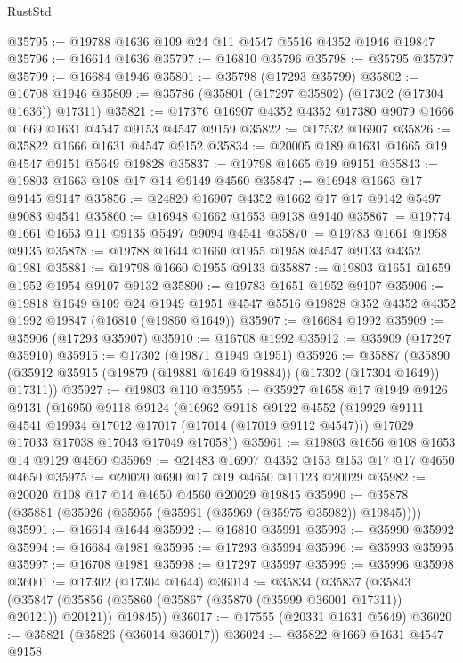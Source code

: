 \begin{lexlean}{RustStd}
\begin{coremodule}
@35795 := @19788 @1636 @109 @24 @11 @4547 @5516 @4352 @1946 @19847
@35796 := @16614 @1636
@35797 := @16810 @35796
@35798 := @35795 @35797
@35799 := @16684 @1946
@35801 := @35798 (@17293 @35799)
@35802 := @16708 @1946
@35809 := @35786 (@35801 (@17297 @35802) (@17302 (@17304 @1636)) @17311)
@35821 := @17376 @16907 @4352 @4352 @17380 @9079 @1666 @1669 @1631 @4547 @9153 @4547 @9159
@35822 := @17532 @16907
@35826 := @35822 @1666 @1631 @4547 @9152
@35834 := @20005 @189 @1631 @1665 @19 @4547 @9151 @5649 @19828
@35837 := @19798 @1665 @19 @9151
@35843 := @19803 @1663 @108 @17 @14 @9149 @4560
@35847 := @16948 @1663 @17 @9145 @9147
@35856 := @24820 @16907 @4352 @1662 @17 @17 @9142 @5497 @9083 @4541
@35860 := @16948 @1662 @1653 @9138 @9140
@35867 := @19774 @1661 @1653 @11 @9135 @5497 @9094 @4541
@35870 := @19783 @1661 @1958 @9135
@35878 := @19788 @1644 @1660 @1955 @1958 @4547 @9133 @4352 @1981
@35881 := @19798 @1660 @1955 @9133
@35887 := @19803 @1651 @1659 @1952 @1954 @9107 @9132
@35890 := @19783 @1651 @1952 @9107
@35906 := @19818
    @1649
    @109
    @24
    @1949
    @1951
    @4547
    @5516
    @19828
    @352
    @4352
    @4352
    @1992
    @19847
    (@16810 (@19860 @1649))
@35907 := @16684 @1992
@35909 := @35906 (@17293 @35907)
@35910 := @16708 @1992
@35912 := @35909 (@17297 @35910)
@35915 := @17302 (@19871 @1949 @1951)
@35926 := @35887
    (@35890 (@35912 @35915 (@19879 (@19881 @1649 @19884)) (@17302 (@17304 @1649)) @17311))
@35927 := @19803 @110
@35955 := @35927
    @1658
    @17
    @1949
    @9126
    @9131
    (@16950
      @9118
      @9124
      (@16962
        @9118
        @9122
        @4552
        (@19929 @9111 @4541 @19934 @17012 @17017 (@17014 (@17019 @9112 @4547)))
        @17029
        @17033
        @17038
        @17043
        @17049
        @17058))
@35961 := @19803 @1656 @108 @1653 @14 @9129 @4560
@35969 := @21483 @16907 @4352 @153 @153 @17 @17 @4650 @4650
@35975 := @20020 @690 @17 @19 @4650 @11123 @20029
@35982 := @20020 @108 @17 @14 @4650 @4560 @20029 @19845
@35990 := @35878 (@35881 (@35926 (@35955 (@35961 (@35969 (@35975 @35982)) @19845))))
@35991 := @16614 @1644
@35992 := @16810 @35991
@35993 := @35990 @35992
@35994 := @16684 @1981
@35995 := @17293 @35994
@35996 := @35993 @35995
@35997 := @16708 @1981
@35998 := @17297 @35997
@35999 := @35996 @35998
@36001 := @17302 (@17304 @1644)
@36014 := @35834
    (@35837
      (@35843
        (@35847 (@35856 (@35860 (@35867 (@35870 (@35999 @36001 @17311)) @20121)) @20121))
        @19845))
@36017 := @17555 (@20331 @1631 @5649)
@36020 := @35821 (@35826 (@36014 @36017))
@36024 := @35822 @1669 @1631 @4547 @9158

\end{coremodule}
\end{lexlean}
